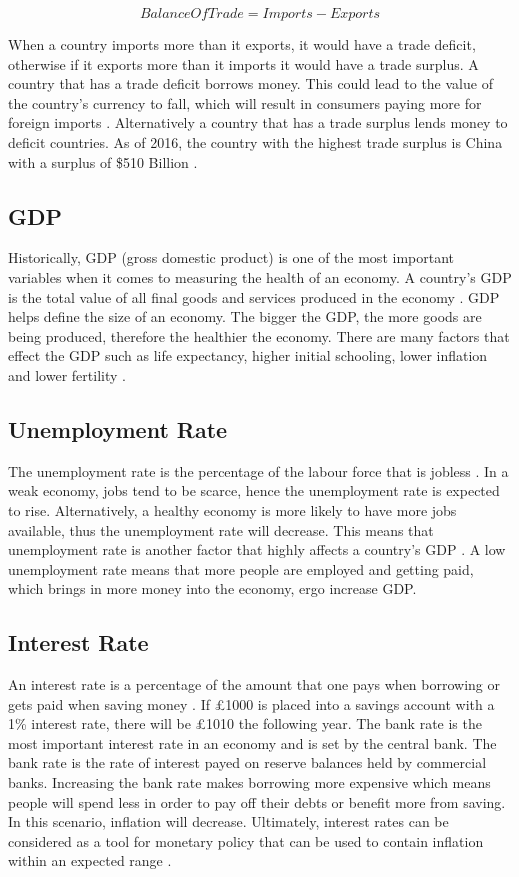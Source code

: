 \documentclass{UoYCSproject}
\begin{document}
\begin{equation}
    Balance Of Trade = Imports - Exports
\end{equation}

When a country imports more than it exports, it would have a trade deficit, otherwise if it exports more than it imports it would have a trade surplus. A country that has a trade deficit borrows money. This could lead to the value of the country's currency to fall, which will result in consumers paying more for foreign imports \cite{2003economics}. Alternatively a country that has a trade surplus lends money to deficit countries. As of 2016, the country with the highest trade surplus is China with a surplus of \$510 Billion \cite{tradesurplus}.   

\subsection{GDP}
Historically, GDP (gross domestic product) is one of the most important variables when it comes to measuring the health of an economy. A country's GDP is the total value of all final goods and services produced in the economy \cite{2003economics}. GDP helps define the size of an economy. The bigger the GDP, the more goods are being produced, therefore the healthier the economy.  There are many factors that effect the GDP such as life expectancy, higher initial schooling, lower inflation and lower fertility \cite{barro1996determinants}. 

\subsection{Unemployment Rate}
The unemployment rate is the percentage of the labour force that is jobless \cite{unemployment}. In a weak economy, jobs tend to be scarce, hence the unemployment rate is expected to rise. Alternatively, a healthy economy is more likely to have more jobs available, thus the unemployment rate will decrease. This means that unemployment rate is another factor that highly affects a country's GDP \cite{bean1993unemployment}. A low unemployment rate means that more people are employed and getting paid, which brings in more money into the economy, ergo increase GDP.  

\subsection{Interest Rate}
An interest rate is a percentage of the amount that one pays when borrowing or gets paid when saving money \cite{interestrate}. If \pounds 1000 is placed into a savings account with a 1\% interest rate, there will be \pounds 1010 the following year.  The bank rate is the most important interest rate in an economy and is set by the central bank. The bank rate is the rate of interest payed on reserve balances held by commercial banks. Increasing the bank rate makes borrowing more expensive which means people will spend less in order to pay off their debts or benefit more from saving. In this scenario, inflation will decrease. Ultimately, interest rates can be considered as a tool for monetary policy that can be used to contain inflation within an expected range \cite{christiano1999monetary}. 
\end{document}
